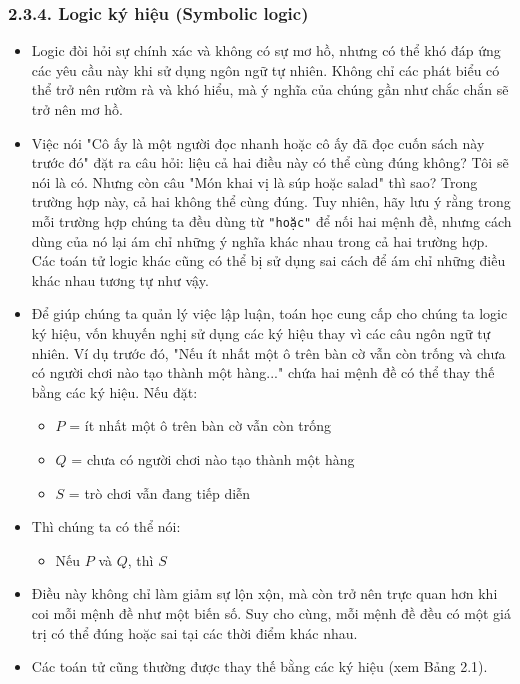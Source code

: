     \subsubsection*{2.3.4. Logic ký hiệu (Symbolic logic)}
    \begin{itemize}
        \item Logic đòi hỏi sự chính xác và không có sự mơ hồ, nhưng có thể khó đáp ứng các yêu cầu này khi sử dụng ngôn ngữ tự nhiên. Không chỉ các phát biểu có thể trở nên rườm rà và khó hiểu, mà ý nghĩa của chúng gần như chắc chắn sẽ trở nên mơ hồ.

        \item Việc nói "Cô ấy là một người đọc nhanh hoặc cô ấy đã đọc cuốn sách này trước đó" đặt ra câu hỏi: liệu cả hai điều này có thể cùng đúng không? Tôi sẽ nói là có. Nhưng còn câu "Món khai vị là súp hoặc salad" thì sao? Trong trường hợp này, cả hai không thể cùng đúng. Tuy nhiên, hãy lưu ý rằng trong mỗi trường hợp chúng ta đều dùng từ \verb|"hoặc"| để nối hai mệnh đề, nhưng cách dùng của nó lại ám chỉ những ý nghĩa khác nhau trong cả hai trường hợp. Các toán tử logic khác cũng có thể bị sử dụng sai cách để ám chỉ những điều khác nhau tương tự như vậy.

        \item Để giúp chúng ta quản lý việc lập luận, toán học cung cấp cho chúng ta logic ký hiệu, vốn khuyến nghị sử dụng các ký hiệu thay vì các câu ngôn ngữ tự nhiên. Ví dụ trước đó, "Nếu ít nhất một ô trên bàn cờ vẫn còn trống và chưa có người chơi nào tạo thành một hàng..." chứa hai mệnh đề có thể thay thế bằng các ký hiệu. Nếu đặt:
        \begin{itemize}
            \item $P$ = ít nhất một ô trên bàn cờ vẫn còn trống
            \item $Q$ = chưa có người chơi nào tạo thành một hàng
            \item $S$ = trò chơi vẫn đang tiếp diễn
        \end{itemize}

        \item Thì chúng ta có thể nói:
        \begin{itemize}
            \item Nếu $P$ và $Q$, thì $S$
        \end{itemize}

        \item Điều này không chỉ làm giảm sự lộn xộn, mà còn trở nên trực quan hơn khi coi mỗi mệnh đề như một biến số. Suy cho cùng, mỗi mệnh đề đều có một giá trị có thể đúng hoặc sai tại các thời điểm khác nhau.

        \item Các toán tử cũng thường được thay thế bằng các ký hiệu (xem Bảng 2.1).
    \end{itemize}


